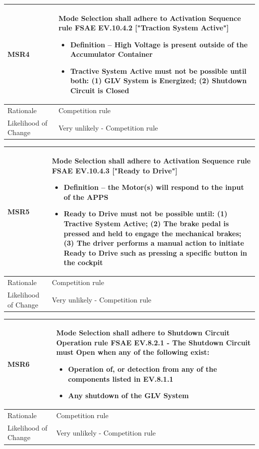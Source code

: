 \documentclass[12pt]{article}
\newcommand{\tableVspace}{5mm}
\newcommand{\ReqColA}{0.13\textwidth}
\newcommand{\ReqColB}{0.82\textwidth}
\begin{document}
\vspace{\tableVspace}
\noindent
\begin{tabular}{| p{\ReqColA} | p{\ReqColB}|}
\hline
\rowcolor[gray]{0.9}
MSR4 & Mode Selection shall adhere to Activation Sequence rule FSAE EV.10.4.2 ["Traction System Active"] 
\begin{itemize}
    \item Definition – High Voltage is present outside of the Accumulator Container
    \item Tractive System Active must not be possible until both: (1) GLV System is Energized; (2) Shutdown Circuit is Closed
\end{itemize} \\
\hline
Rationale & Competition rule\\
\hline
Likelihood of Change & Very unlikely - Competition rule \\
\hline
\end{tabular} 

\vspace{\tableVspace}
\noindent
\begin{tabular}{| p{\ReqColA} | p{\ReqColB}|}
\hline
\rowcolor[gray]{0.9}
MSR5 & Mode Selection shall adhere to Activation Sequence rule FSAE EV.10.4.3 ["Ready to Drive"] 
\begin{itemize}
    \item Definition – the Motor(s) will respond to the input of the APPS
    \item Ready to Drive must not be possible until: (1) Tractive System Active; (2) The brake pedal is pressed and held to engage the mechanical brakes; (3) The driver performs a manual action to initiate Ready to Drive
    such as pressing a specific button in the cockpit
\end{itemize} \\
\hline
Rationale & Competition rule\\
\hline
Likelihood of Change & Very unlikely - Competition rule \\
\hline
\end{tabular} 

\vspace{\tableVspace}
\noindent
\begin{tabular}{| p{\ReqColA} | p{\ReqColB}|}
\hline
\rowcolor[gray]{0.9}
MSR6 & Mode Selection shall adhere to Shutdown Circuit Operation rule FSAE EV.8.2.1 - The Shutdown Circuit must Open when any of the following exist:
\begin{itemize}
    \item Operation of, or detection from any of the components listed in EV.8.1.1
    \item Any shutdown of the GLV System
\end{itemize} \\
\hline
Rationale & Competition rule\\
\hline
Likelihood of Change & Very unlikely - Competition rule \\
\hline
\end{tabular} 
\end{document}
